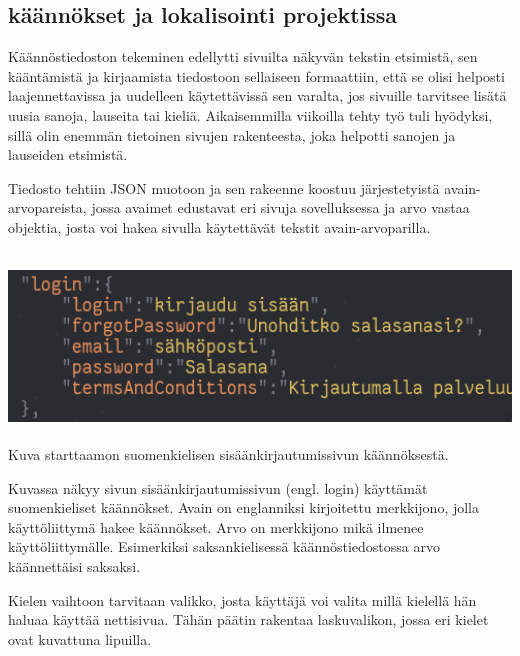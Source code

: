 \subsection*{käännökset ja lokalisointi projektissa}

Käännöstiedoston tekeminen edellytti sivuilta näkyvän tekstin etsimistä, sen kääntämistä ja kirjaamista tiedostoon sellaiseen formaattiin, että se olisi helposti laajennettavissa ja uudelleen käytettävissä sen varalta, jos sivuille tarvitsee lisätä uusia sanoja, lauseita tai kieliä.
Aikaisemmilla viikoilla tehty työ tuli hyödyksi, sillä olin enemmän tietoinen sivujen rakenteesta, joka helpotti sanojen ja lauseiden etsimistä.\medskip

Tiedosto tehtiin JSON muotoon ja sen rakeenne koostuu järjestetyistä avain-arvopareista, jossa avaimet edustavat eri sivuja sovelluksessa ja
arvo vastaa objektia, josta voi hakea sivulla käytettävät tekstit avain-arvoparilla.



\medskip
\includegraphics[width= 15cm, height=5cm]{src/public/jsonfixed.png} \\
\medskip
Kuva starttaamon suomenkielisen sisäänkirjautumissivun käännöksestä.
\medskip

Kuvassa näkyy sivun sisäänkirjautumissivun (engl. login) käyttämät suomenkieliset käännökset. Avain on englanniksi kirjoitettu merkkijono, jolla käyttöliittymä hakee käännökset. Arvo on merkkijono mikä ilmenee käyttöliittymälle.
Esimerkiksi saksankielisessä käännöstiedostossa arvo käännettäisi saksaksi.

\medskip

Kielen vaihtoon tarvitaan valikko, josta käyttäjä voi valita millä kielellä hän haluaa käyttää nettisivua. 
Tähän päätin rakentaa laskuvalikon, jossa eri kielet ovat kuvattuna lipuilla.
\medskip





